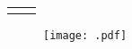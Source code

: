 
\begin{table}[H]
    \centering
    \caption{}
    \label{tab:}
    \begin{tabular}{S S}
        \toprule
        {} & {} \\
        \midrule
         & \\
        \bottomrule
    \end{tabular}
\end{table}



\begin{figure}[H]
    \centering
    \texttt{[image: .pdf]}
    \caption{}
    \label{fig:}
\end{figure}